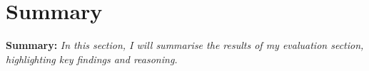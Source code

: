 \section{Summary}
\begin{tcolorbox}[boxsep=0mm,left=2.5mm,right=2.5mm]
    \textbf{Summary:} {\em In this section, I will summarise the results of my
    evaluation section, highlighting key findings and reasoning.
    }
\end{tcolorbox}

